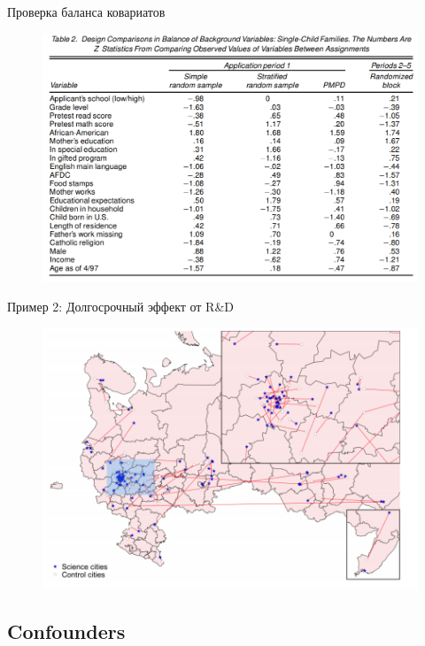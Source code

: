 \begin{frame}{Проверка баланса ковариатов}
    \begin{figure}
     \centering
     \includegraphics[width=\textwidth]{Images/Matching1.png}
\end{figure}
\end{frame}

\begin{frame}{Пример 2: Долгосрочный эффект от R\&D  \parencite{schweiger2018long}}
\begin{figure}
    \centering
    \includegraphics[width=\textwidth]{Images/Naukograds.png}
\end{figure}
\end{frame}

\subsection{Confounders}

